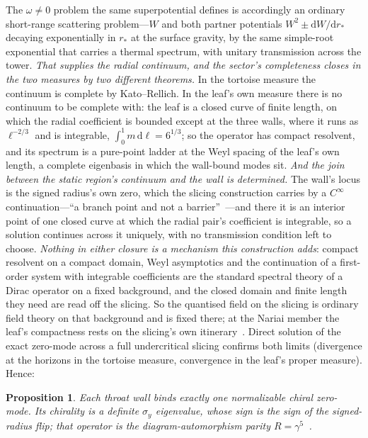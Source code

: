 \documentclass[11pt]{article}
\newcommand{\dd}{\mathrm{d}}
\newtheorem{proposition}{Proposition}
\begin{document}
The $\omega\neq0$ problem the same superpotential defines is accordingly an ordinary short-range scattering problem---$W$ and both partner potentials $W^{2}\pm\dd W/\dd r_{*}$ decaying exponentially in $r_{*}$ at the surface gravity, by the same simple-root exponential that carries a thermal spectrum, with unitary transmission across the tower. \emph{That supplies the radial continuum, and the sector's completeness closes in the two measures by two different theorems.} In the tortoise measure the continuum is complete by Kato--Rellich. In the leaf's own measure there is no continuum to be complete with: the leaf is a closed curve of finite length, on which the radial coefficient is bounded except at the three walls, where it runs as $\ell^{-2/3}$ and is integrable, $\int_0^1 m\,\dd\ell=6^{1/3}$; so the operator has compact resolvent, and its spectrum is a pure-point ladder at the Weyl spacing of the leaf's own length, a complete eigenbasis in which the wall-bound modes sit. \emph{And the join between the static region's continuum and the wall is determined.} The wall's locus is the signed radius's own zero, which the slicing construction carries by a $C^{\infty}$ continuation---``a branch point and not a barrier''~\cite{JanzenSlicing,JanzenCircle}---and there it is an interior point of one closed curve at which the radial pair's coefficient is integrable, so a solution continues across it uniquely, with no transmission condition left to choose. \emph{Nothing in either closure is a mechanism this construction adds}: compact resolvent on a compact domain, Weyl asymptotics and the continuation of a first-order system with integrable coefficients are the standard spectral theory of a Dirac operator on a fixed background, and the closed domain and finite length they need are read off the slicing. So the quantised field on the slicing is ordinary field theory on that background and is fixed there; at the Nariai member the leaf's compactness rests on the slicing's own itinerary~\cite{JanzenSlicing}. Direct solution of the exact zero-mode across a full undercritical slicing confirms both limits (divergence at the horizons in the tortoise measure, convergence in the leaf's proper measure). Hence:
\begin{proposition}\label{prop:wall}
Each throat wall binds exactly one normalizable chiral zero-mode. Its chirality is a definite $\sigma_y$ eigenvalue, whose sign is the sign of the signed-radius flip; that operator is the diagram-automorphism parity $R=\gamma^5$~\cite{JanzenAlgebroid}.
\end{proposition}
\end{document}
